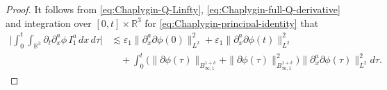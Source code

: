 \documentclass[11pt,twoside]{article}
\def\ls{\lesssim}
\theoremstyle{plain}
\theoremstyle{definition}
\theoremstyle{assumption}
\numberwithin{equation}{section}
\begin{document}
\begin{proof}
		It follows from \eqref{eq:Chaplygin-Q-Linfty},
		\eqref{eq:Chaplygin-full-Q-derivative} and integration over
		$[0,t]\times\mathbb R^3$ for
		\eqref{eq:Chaplygin-principal-identity} that
		\begin{equation}\label{eq:Chaplygin-I1-estimate}
			\begin{aligned}
				\big|
				\int_0^t\int_{\mathbb R^3}
				\partial_t\partial_x^a\phi\,
				I_1^a\,dx\,d\tau
				\big|
				&\ls
				\varepsilon_1
				\|\partial_x^a\partial\phi(0)\|_{L^2}^2
				+
				\varepsilon_1
				\|\partial_x^a\partial\phi(t)\|_{L^2}^2
				\\
				&\quad+
				\int_0^t
				\big(
				\|\partial\phi(\tau)\|_{B_{\infty,1}^{1+\delta}}
				+
				\|\partial\phi(\tau)\|_{B_{\infty,1}^{1+\delta}}^2
				\big)
				\|\partial_x^a\partial\phi(\tau)\|_{L^2}^2
				d\tau.
			\end{aligned}
		\end{equation}
		

\end{proof}
\end{document}
